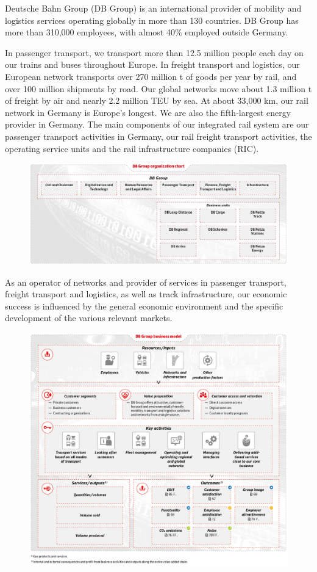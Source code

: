 \documentclass[]{book}
\begin{document}
Deutsche Bahn Group (DB Group) is an international provider of mobility
and logistics services operating globally in more than 130 countries. DB
Group has more than 310,000 employees, with almost 40\% employed outside
Germany.

In passenger transport, we transport more than 12.5 million people each
day on our trains and buses throughout Europe. In freight transport and
logistics, our European network transports over 270 million t of goods
per year by rail, and over 100 million shipments by road. Our global
networks move about 1.3 million t of freight by air and nearly 2.2
million TEU by sea. At about 33,000 km, our rail network in Germany is
Europe's longest. We are also the fifth-largest energy provider in
Germany. The main components of our integrated rail system are our
passenger transport activities in Germany, our rail freight transport
activities, the operating service units and the rail infrastructure
companies (RIC).

\begin{figure}
\centering
\includegraphics{db2.JPG}
\caption{}
\end{figure}

As an operator of networks and provider of services in passenger
transport, freight transport and logistics, as well as track
infrastructure, our economic success is influenced by the general
economic environment and the specific development of the various
relevant markets.

\begin{figure}
\centering
\includegraphics{db3.jpg}
\caption{}
\end{figure}
\end{document}
